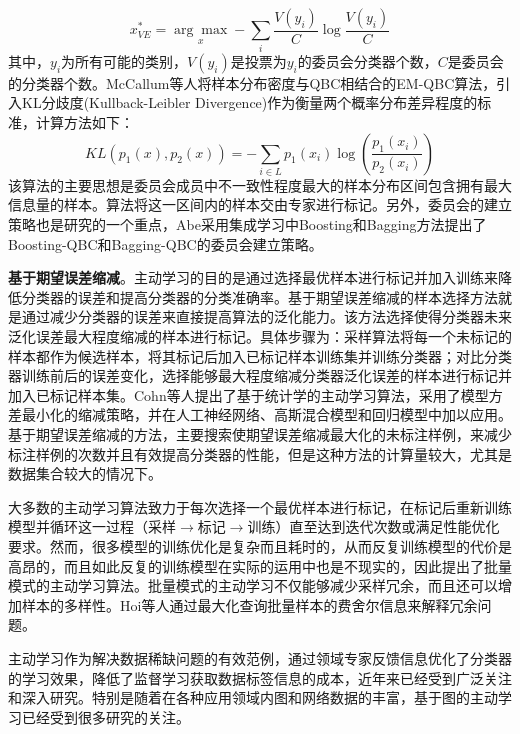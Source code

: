 \begin{asparaenum}
\begin{equation}
x_{VE}^{*}=\underset{x}{\arg\max}-\sum_{i}\frac {V(y_{i})} {C}\log \frac {V(y_{i})} {C}
\end{equation}
其中，$y_{i}$为所有可能的类别，$V(y_{i})$是投票为$y_{i}$的委员会分类器个数，$C$是委员会的分类器个数。McCallum等人将样本分布密度与QBC相结合的EM-QBC算法，引入KL分歧度(Kullback-Leibler Divergence)作为衡量两个概率分布差异程度的标准，计算方法如下：
\begin{equation}
KL(p_{1}(x),p_{2}(x))=-\sum_{i\in L}p_{1}(x_{i})\log\left (\frac {p_{1}(x_{i})} {p_{2}(x_{i})}  \right )
\end{equation}
该算法的主要思想是委员会成员中不一致性程度最大的样本分布区间包含拥有最大信息量的样本。算法将这一区间内的样本交由专家进行标记。另外，委员会的建立策略也是研究的一个重点，Abe采用集成学习中Boosting和Bagging方法提出了Boosting-QBC和Bagging-QBC的委员会建立策略\cite{naoki1998query}。
\item \textbf{基于期望误差缩减}。主动学习的目的是通过选择最优样本进行标记并加入训练来降低分类器的误差和提高分类器的分类准确率。基于期望误差缩减的样本选择方法就是通过减少分类器的误差来直接提高算法的泛化能力。该方法选择使得分类器未来泛化误差最大程度缩减的样本进行标记。具体步骤为：采样算法将每一个未标记的样本都作为候选样本，将其标记后加入已标记样本训练集并训练分类器；对比分类器训练前后的误差变化，选择能够最大程度缩减分类器泛化误差的样本进行标记并加入已标记样本集。Cohn等人\cite{cohn1996active}提出了基于统计学的主动学习算法，采用了模型方差最小化的缩减策略，并在人工神经网络、高斯混合模型和回归模型中加以应用。基于期望误差缩减的方法，主要搜索使期望误差缩减最大化的未标注样例，来减少标注样例的次数并且有效提高分类器的性能，但是这种方法的计算量较大，尤其是数据集合较大的情况下。
\end{asparaenum}

大多数的主动学习算法致力于每次选择一个最优样本进行标记，在标记后重新训练模型并循环这一过程（采样$\rightarrow$标记$\rightarrow$训练）直至达到迭代次数或满足性能优化要求。然而，很多模型的训练优化是复杂而且耗时的，从而反复训练模型的代价是高昂的，而且如此反复的训练模型在实际的运用中也是不现实的，因此提出了批量模式的主动学习算法。批量模式的主动学习不仅能够减少采样冗余，而且还可以增加样本的多样性。Hoi等人通过最大化查询批量样本的费舍尔信息来解释冗余问题\cite{hoi2006large,hoi2006batch}。

主动学习作为解决数据稀缺问题的有效范例，通过领域专家反馈信息优化了分类器的学习效果，降低了监督学习获取数据标签信息的成本，近年来已经受到广泛关注和深入研究\cite{nguyen2004active,muslea2006active}。特别是随着在各种应用领域内图和网络数据的丰富，基于图的主动学习已经受到很多研究的关注\cite{cesa2010active,cesa2010activetreesandgraph,zhao2008scalable}。

